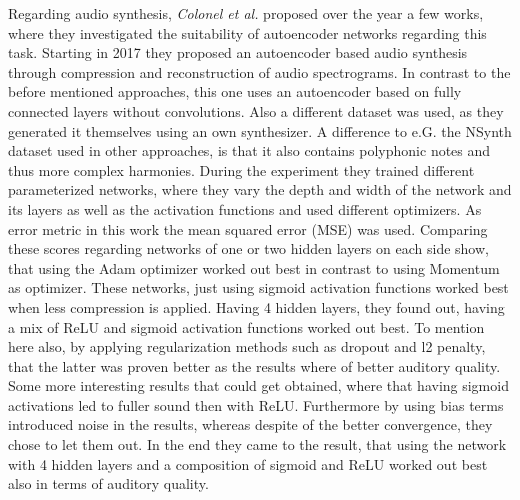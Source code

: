 Regarding audio synthesis, \textit{Colonel et al.} proposed over the year a few works, where they investigated the suitability of autoencoder networks regarding this task. \cite{colonel2017improving, colonel2018autoencoding, Colonel2020} Starting in 2017 they proposed an autoencoder based audio synthesis through compression and reconstruction of audio spectrograms. In contrast to the before mentioned approaches, this one uses an autoencoder based on fully connected layers without convolutions. Also a different dataset was used, as they generated it themselves using an own synthesizer. A difference to e.G. the NSynth dataset used in other approaches, is that it also contains polyphonic notes and thus more complex harmonies. During the experiment they trained different parameterized networks, where they vary the depth and width of the network and its layers as well as the activation functions and used different optimizers. As error metric in this work the mean squared error (MSE) was used. Comparing these scores regarding networks of one or two hidden layers on each side show, that using the Adam optimizer worked out best in contrast to using Momentum as optimizer. These networks, just using sigmoid activation functions worked best when less compression is applied. Having 4 hidden layers, they found out, having a mix of ReLU and sigmoid activation functions worked out best. To mention here also, by applying regularization methods such as dropout and l2 penalty, that the latter was proven better as the results where of better auditory quality. Some more interesting results that could get obtained, where that having sigmoid activations led to fuller sound then with ReLU. Furthermore by using bias terms introduced noise in the results, whereas despite of the better convergence, they chose to let them out. In the end they came to the result, that using the network with 4 hidden layers and a composition of sigmoid and ReLU worked out best also in terms of auditory quality.\\

